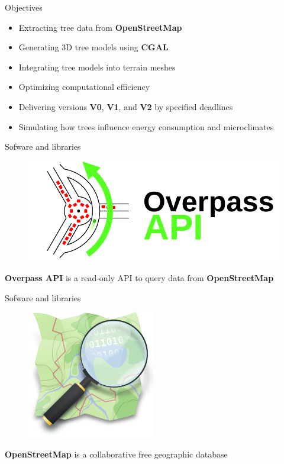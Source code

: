 \documentclass[10pt]{beamer}
\begin{document}
\begin{frame}{Objectives}
  \begin{itemize}
      \item Extracting tree data from \textbf{OpenStreetMap}
      \item Generating 3D tree models using \textbf{CGAL}
      \item Integrating tree models into terrain meshes
      \item Optimizing computational efficiency
      \item Delivering versions \textbf{V0}, \textbf{V1}, and \textbf{V2} by specified deadlines
      \item Simulating how trees influence energy consumption and microclimates
  \end{itemize}
\end{frame}

\begin{frame}{Sofware and libraries}
  \begin{figure}[H]
      \centering
      \includegraphics[width=\textwidth]{images/OvAPI_logo.png}
  \end{figure}
  \begin{center}
  \textbf{Overpass API} is a read-only API to query data from \textbf{OpenStreetMap}
  \end{center}
\end{frame}

\begin{frame}{Sofware and libraries}
  \begin{figure}[H]
      \centering
      \includegraphics[width=0.5\textwidth]{images/osm_logo.png}
  \end{figure}
  \begin{center}
  \textbf{OpenStreetMap} is a collaborative free geographic database
  \end{center}
\end{frame}
\end{document}
